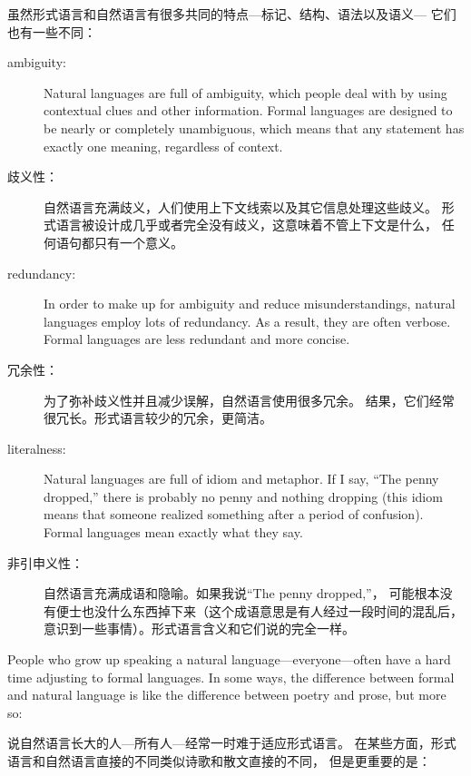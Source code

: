 \documentclass[10pt]{book}
\begin{document}
\begin{CJK}{UTF8}{gbsn}
虽然形式语言和自然语言有很多共同的特点---标记、结构、语法以及语义---
它们也有一些不同：

\begin{description}

\item[ambiguity:] Natural languages are full of ambiguity, which
people deal with by using contextual clues and other information.
Formal languages are designed to be nearly or completely unambiguous,
which means that any statement has exactly one meaning,
regardless of context.

\item[歧义性：] 自然语言充满歧义，人们使用上下文线索以及其它信息处理这些歧义。
形式语言被设计成几乎或者完全没有歧义，这意味着不管上下文是什么，
任何语句都只有一个意义。

\item[redundancy:] In order to make up for ambiguity and reduce
misunderstandings, natural languages employ lots of
redundancy.  As a result, they are often verbose.  Formal languages
are less redundant and more concise.

\item[冗余性：] 为了弥补歧义性并且减少误解，自然语言使用很多冗余。
结果，它们经常很冗长。形式语言较少的冗余，更简洁。

\item[literalness:] Natural languages are full of idiom and metaphor.
If I say, ``The penny dropped,'' there is probably no penny and
nothing dropping (this idiom means that someone realized something
after a period of confusion).  Formal languages
mean exactly what they say.

\item[非引申义性：] 自然语言充满成语和隐喻。如果我说``The penny dropped,''，
可能根本没有便士也没什么东西掉下来（这个成语意思是有人经过一段时间的混乱后，
意识到一些事情）。形式语言含义和它们说的完全一样。

\end{description}

People who grow up speaking a natural language---everyone---often have a
hard time adjusting to formal languages.  In some ways, the difference
between formal and natural language is like the difference between
poetry and prose, but more so:

说自然语言长大的人---所有人---经常一时难于适应形式语言。
在某些方面，形式语言和自然语言直接的不同类似诗歌和散文直接的不同，
但是更重要的是：

\begin{description}


\end{description}
\end{CJK}
\end{document}
